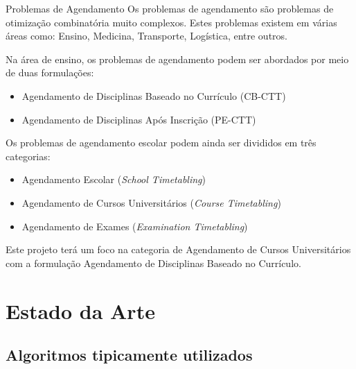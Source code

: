 \documentclass[11]{beamer}
\begin{document}
    \begin{frame}{Problemas de Agendamento}
        \justifying
        Os problemas de agendamento são problemas de otimização combinatória muito complexos. Estes problemas existem em várias áreas como: Ensino, Medicina, Transporte, Logística, entre outros.

        \vspace{.5em}
        Na área de ensino, os problemas de agendamento podem ser abordados por meio de duas formulações:
        
        \vspace{.5em}
        \begin{itemize}
            \item Agendamento de Disciplinas Baseado no Currículo (CB-CTT)
            \item Agendamento de Disciplinas Após Inscrição (PE-CTT)
        \end{itemize}
    \end{frame}

    \begin{frame}
        \justifying
        Os problemas de agendamento escolar podem ainda ser divididos em três categorias:

        \vspace{.5em}
        \begin{itemize}
            \item Agendamento Escolar (\textit{School Timetabling})
            \item Agendamento de Cursos Universitários (\textit{Course Timetabling})
            \item Agendamento de Exames (\textit{Examination Timetabling})
        \end{itemize}
        \vspace{.5em}

        Este projeto terá um foco na categoria de Agendamento de Cursos Universitários com a formulação Agendamento de Disciplinas Baseado no Currículo.
    \end{frame}

    \section{Estado da Arte}

    \subsection{Algoritmos tipicamente utilizados}
\end{document}
